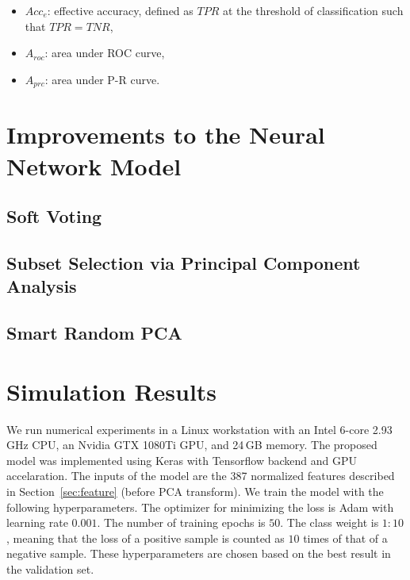 \documentclass[10pt, final, letter, twocolumns]{IEEEtran}
\begin{document}
\begin{itemize}\vspace{-1mm}
\item $Acc_{e}$: effective accuracy, defined as $TPR$ at the threshold of classification such that $TPR=TNR$,
\item $A_{roc}$: area under ROC curve,
\item $A_{prc}$: area under P-R curve.
\end{itemize}\vspace{-1mm}


%

\section{Improvements to the Neural Network Model}
\label{sec:improvements}


\subsection{Soft Voting}
\label{subsec:soft-voting}


\subsection{Subset Selection via Principal Component Analysis}
\label{subsec:PCA}

\subsection{Smart Random PCA}
\label{subsec:smartPCA}






\vspace{-1mm}
\section{Simulation Results}\vspace{-1mm}
\label{sec:results}
We run numerical experiments in a Linux workstation with an Intel 6-core 2.93\,GHz CPU, an Nvidia GTX 1080Ti GPU, and 24\,GB memory. The proposed model was implemented using Keras with Tensorflow backend and GPU accelaration. The inputs of the model are the 387 normalized features described in Section~\ref{sec:feature} (before PCA transform). We train the model with the following hyperparameters. The optimizer for minimizing the loss is Adam \cite{adam} with learning rate $0.001$. The number of training epochs is $50$. The class weight is $1:10$, meaning that the loss of a positive sample is counted as $10$ times of that of a negative sample. These hyperparameters are chosen based on the best result in the validation set. 
\end{document}

